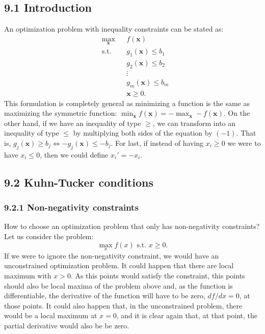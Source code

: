 \documentclass[0pt, a4paper]{article}
\begin{document}
\subsection*{9.1 Introduction}

An optimization problem with inequality constraints can be stated as:
\begin{equation*}
	\begin{aligned}
		& \underset{\textbf{x}}{\text{max}}
		& & f(\textbf{x}) \\
		& \text{s.t.}
		& & g_1(\textbf{x})\leq b_1\\
		& & & g_2(\textbf{x})\leq b_2\\
		& & & \vdots\\
		& & & g_m(\textbf{x})\leq b_m\\
		& & & \textbf{x}\geq0.
	\end{aligned}
\end{equation*}
This formulation is completely general as minimizing a function is the same as maximizing the symmetric function: $\min_\textbf{x}f(\textbf{x})=-\max_\textbf{x}-f(\textbf{x})$. On the other hand, if we have an inequality of type $\geq$, we can transform into an inequality of type $\leq$ by multiplying both sides of the equation by $(-1)$. That is, $g_j(\textbf{x})\geq b_j\Leftrightarrow-g_j(\textbf{x})\leq-b_j$. For last, if instead of having $x_i\geq0$ we were to have $x_i\leq0$, then we could define $x_i'=-x_i$.

\subsection*{9.2 Kuhn-Tucker conditions}

\subsubsection*{9.2.1 Non-negativity constraints}

How to choose an optimization problem that only has non-negativity constraints? Let us consider the problem:
$$\max_x f(x)\text{ s.t. }x\geq0.$$
If we were to ignore the non-negativity constraint, we would have an unconstrained optimization problem. It could happen that there are local maximum with $x>0$. As this points would satisfy the constraint, this points should also be local maxima of the problem above and, as the function is differentiable, the derivative of the function will have to be zero, $df/dx=0$, at those points. It could also happen that, in the unconstrained problem, there would be a local maximum at $x=0$, and it is clear again that, at that point, the partial derivative would also be be zero.
\end{document}
